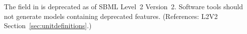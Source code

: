 The  field in \Unit is deprecated as of SBML Level~2
Version~2.  Software tools should not generate models containing deprecated
features.  (References: L2V2 Section~\ref{sec:unitdefinitions}.)
